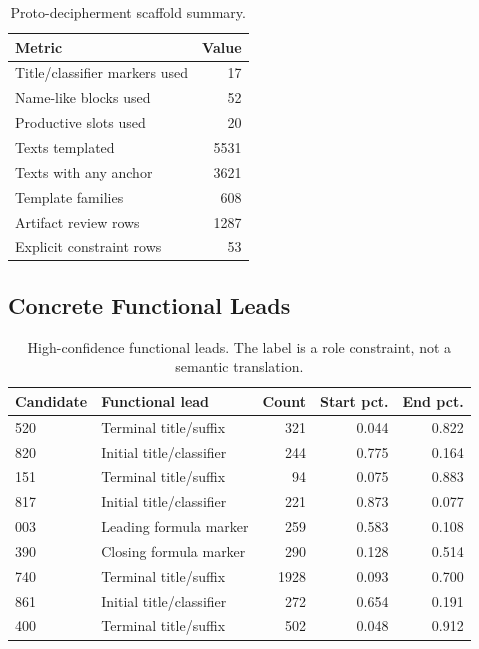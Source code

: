 \begin{table}[htbp]
\centering
\begin{tabular}{lr}
\toprule
\textbf{Metric} & \textbf{Value} \\
\midrule
Title/classifier markers used & 17 \\
Name-like blocks used & 52 \\
Productive slots used & 20 \\
Texts templated & 5531 \\
Texts with any anchor & 3621 \\
Template families & 608 \\
Artifact review rows & 1287 \\
Explicit constraint rows & 53 \\
\bottomrule
\end{tabular}
\caption{Proto-decipherment scaffold summary.}
\label{tab:proto-decipherment-summary}
\end{table}

\subsection{Concrete Functional Leads}

\begin{table}[htbp]
\centering
\begin{tabular}{llrrr}
\toprule
\textbf{Candidate} & \textbf{Functional lead} & \textbf{Count} & \textbf{Start pct.} & \textbf{End pct.} \\
\midrule
520 & Terminal title/suffix & 321 & 0.044 & 0.822 \\
820 & Initial title/classifier & 244 & 0.775 & 0.164 \\
151 & Terminal title/suffix & 94 & 0.075 & 0.883 \\
817 & Initial title/classifier & 221 & 0.873 & 0.077 \\
003 & Leading formula marker & 259 & 0.583 & 0.108 \\
390 & Closing formula marker & 290 & 0.128 & 0.514 \\
740 & Terminal title/suffix & 1928 & 0.093 & 0.700 \\
861 & Initial title/classifier & 272 & 0.654 & 0.191 \\
400 & Terminal title/suffix & 502 & 0.048 & 0.912 \\
\bottomrule
\end{tabular}
\caption{High-confidence functional leads. The label is a role constraint, not a semantic translation.}
\label{tab:functional-leads}
\end{table}


